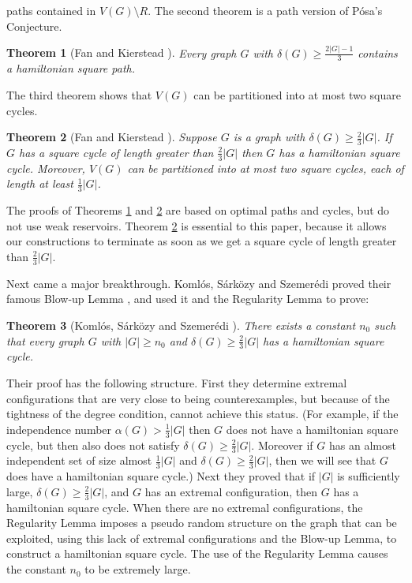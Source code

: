 \documentclass[oneside,12pt]{memoir}
\newtheorem{theorem}{Theorem}[section]
\begin{document}
paths contained in  $V(G)\setminus R$. The second theorem is a
path version of P\'osa's Conjecture. 
\begin{theorem}[Fan and Kierstead \cite{FK2}]
\label{thm:FK2}Every graph $G$ with $\delta(G)\ge\frac{2|G|-1}{3}$
contains a hamiltonian square path. 
\end{theorem}
The third theorem shows that $V(G)$ can be partitioned into at most two square cycles.
\begin{theorem}[Fan and Kierstead \cite{FK3}]
\label{thm:FK3}Suppose $G$ is a graph with $\delta(G)\ge\frac{2}{3}|G|$.
If $G$ has a square cycle of length greater than $\frac{2}{3}|G|$
then $G$ has a hamiltonian square cycle. Moreover, $V(G)$ can be
partitioned into at most two square cycles, each of length at least $\frac{1}{3}|G|$. 
\end{theorem}
The proofs of Theorems \ref{thm:FK2} and \ref{thm:FK3} are based
on optimal paths and cycles, but do not use weak reservoirs. Theorem
\ref{thm:FK3} is essential to this paper, because it allows our constructions 
to terminate as soon as we get a square cycle of length greater than
$\frac{2}{3}|G|$.

Next came a major breakthrough. Koml\'os, S\'ark\"ozy and Szemer\'edi proved
their famous Blow-up Lemma \cite{KSSbu}, and used it and the Regularity
Lemma \cite{Sz} to prove: 
\begin{theorem}[Koml\'os, S\'ark\"ozy and Szemer\'edi \cite{KSSp}]
\label{thm:KSSp}There exists a constant $n_0$ such that every graph
$G$ with $|G|\ge n_0$ and $\delta(G)\ge\frac{2}{3}|G|$ has a hamiltonian
square cycle.
\end{theorem}
Their proof has the following structure. First they determine extremal
configurations that are very close to being counterexamples, but because
of the tightness of the degree condition, cannot achieve this status.
(For example, if the independence number $\alpha(G)>\frac{1}{3}|G|$
then $G$ does not have a hamiltonian square cycle, but then also does 
not satisfy $\delta(G)\ge\frac{2}{3}|G|.$ Moreover if $G$ has an
almost independent set of size almost $\frac{1}{3}|G|$ and $\delta(G)\geq \frac{2}{3}|G|$, then we will %
see that $G$ does have a hamiltonian square cycle.) Next they proved
that if $|G|$ is sufficiently large, $\delta(G)\ge\frac{2}{3}|G|$,
and $G$ has an extremal configuration, then $G$ has a hamiltonian
square cycle. When there are no extremal configurations, the Regularity
Lemma imposes a pseudo random structure on the graph that can be exploited,
using this lack of extremal configurations and the Blow-up Lemma,
to construct a hamiltonian square cycle. The use of the Regularity
Lemma causes the constant $n_0$ to be extremely large.
\end{document}
